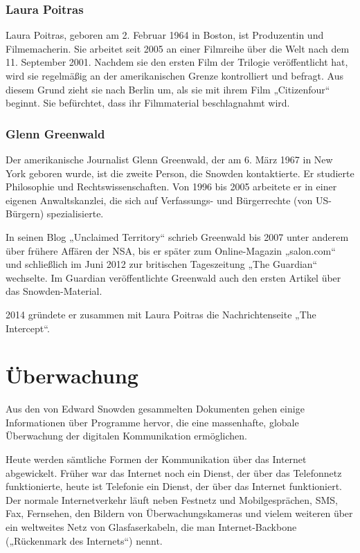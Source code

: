 \documentclass[12pt,a4paper]{scrartcl}
\begin{document}
\subsubsection{Laura Poitras}
Laura Poitras, geboren am 2. Februar 1964 in Boston, ist Produzentin und Filmemacherin. Sie arbeitet seit 2005 an einer Filmreihe über die Welt nach dem 11. September 2001. Nachdem sie den ersten Film der Trilogie veröffentlicht hat, wird sie regelmäßig an der amerikanischen Grenze kontrolliert und befragt. Aus diesem Grund zieht sie nach Berlin um, als sie mit ihrem Film „Citizenfour“ beginnt. Sie befürchtet, dass ihr Filmmaterial beschlagnahmt wird.\cite{praxisfilms}\cite{citizenfour}

\subsubsection{Glenn Greenwald}
Der amerikanische Journalist Glenn Greenwald, der am 6. März 1967 in New York geboren wurde, ist die zweite Person, die Snowden kontaktierte. Er studierte Philosophie und Rechtswissenschaften.\cite{wiki_greenwald} Von 1996 bis 2005 arbeitete er in einer eigenen Anwaltskanzlei, die sich auf Verfassungs- und Bürgerrechte (von US-Bürgern) spezialisierte.\cite{unclaimed_response}

In seinen Blog „Unclaimed Territory“ schrieb Greenwald bis 2007 unter anderem über frühere Affären der NSA, bis er später zum Online-Magazin „salon.com“ und schließlich im Juni 2012 zur britischen Tageszeitung „The Guardian“ wechselte. Im Guardian veröffentlichte Greenwald auch den ersten Artikel über das Snowden-Material.\cite{wiki_greenwald}

2014 gründete er zusammen mit Laura Poitras die Nachrichtenseite „The Intercept“.\cite{intercept_about}

\section{Überwachung}
Aus den von Edward Snowden gesammelten Dokumenten gehen einige Informationen über Programme hervor, die eine massenhafte, globale Überwachung der digitalen Kommunikation ermöglichen.

Heute werden sämtliche Formen der Kommunikation über das Internet abgewickelt. Früher war das Internet noch ein Dienst, der über das Telefonnetz funktionierte, heute ist Telefonie ein Dienst, der über das Internet funktioniert. Der normale Internetverkehr läuft neben Festnetz und Mobilgesprächen, SMS, Fax, Fernsehen, den Bildern von Überwachungskameras und vielem weiteren über ein weltweites Netz von Glasfaserkabeln, die man Internet-Backbone („Rückenmark des Internets“) nennt.
\end{document}
